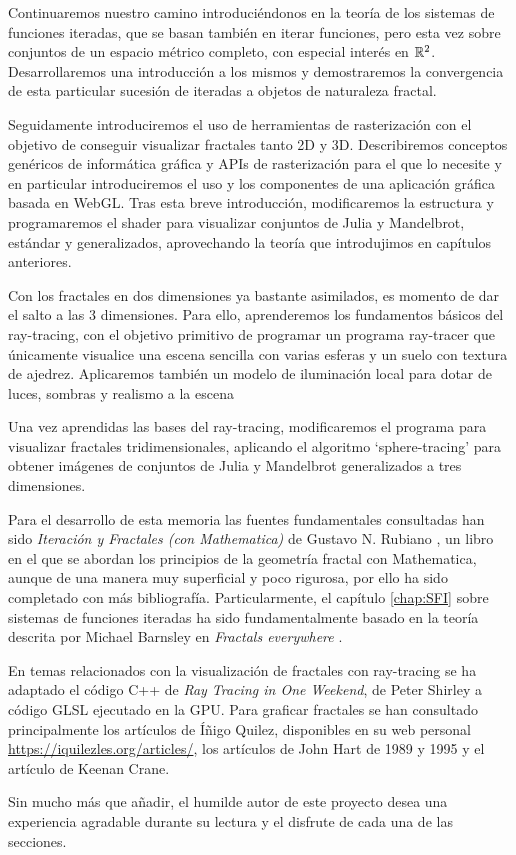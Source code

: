 Continuaremos nuestro camino introduciéndonos en la teoría de los sistemas de funciones iteradas, que se basan también en iterar funciones, pero esta vez sobre conjuntos de un espacio métrico completo, con especial interés en $\mathbb{R}^2$. Desarrollaremos una introducción a los mismos y demostraremos la convergencia de esta particular sucesión de iteradas a objetos de naturaleza fractal.

Seguidamente introduciremos el uso de herramientas de rasterización con el objetivo de conseguir visualizar fractales tanto 2D y 3D. Describiremos conceptos genéricos de informática gráfica y APIs de rasterización para el que lo necesite y en particular introduciremos el uso y los componentes de una aplicación gráfica basada en WebGL. Tras esta breve introducción, modificaremos la estructura y programaremos el shader para visualizar conjuntos de Julia y Mandelbrot, estándar y generalizados, aprovechando la teoría que introdujimos en capítulos anteriores.

Con los fractales en dos dimensiones ya bastante asimilados, es momento de dar el salto a las 3 dimensiones. Para ello, aprenderemos los fundamentos básicos del ray-tracing, con el objetivo primitivo de programar un programa ray-tracer que únicamente visualice una escena sencilla con varias esferas y un suelo con textura de ajedrez. Aplicaremos también un modelo de iluminación local para dotar de luces, sombras y realismo a la escena

Una vez aprendidas las bases del ray-tracing, modificaremos el programa para visualizar fractales tridimensionales, aplicando el algoritmo `sphere-tracing' para obtener imágenes de conjuntos de Julia y Mandelbrot generalizados a tres dimensiones.

Para el desarrollo de esta memoria las fuentes fundamentales consultadas han sido \textit{Iteración y Fractales (con Mathematica)} de Gustavo N. Rubiano \cite{rubiano}, un libro en el que se abordan los principios de la geometría fractal con Mathematica, aunque de una manera muy superficial y poco rigurosa, por ello ha sido completado con más bibliografía. Particularmente, el capítulo \ref{chap:SFI} sobre sistemas de funciones iteradas ha sido fundamentalmente basado en la teoría descrita por Michael Barnsley en \textit{Fractals everywhere} \cite{Barnsley}. 

En temas relacionados con la visualización de fractales con ray-tracing se ha adaptado el código C++ de \textit{Ray Tracing in One Weekend}, de Peter Shirley \cite{Shirley} a código GLSL ejecutado en la GPU. Para graficar fractales se han consultado principalmente los artículos de Íñigo Quilez, disponibles en su web personal \url{https://iquilezles.org/articles/}, los artículos de John Hart de 1989 \cite{Hart-1989} y 1995 \cite{Hart-1995} y el artículo \cite{keenan-crane} de Keenan Crane. 

Sin mucho más que añadir, el humilde autor de este proyecto desea una experiencia agradable durante su lectura y el disfrute de cada una de las secciones.






